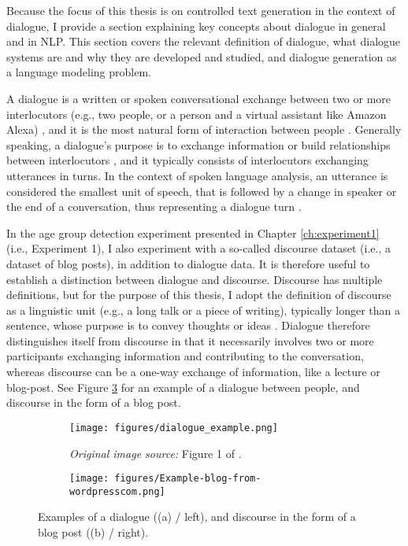Because the focus of this thesis is on controlled text generation in the context of dialogue, I provide a section explaining key concepts about dialogue in general and in NLP. This section covers the relevant definition of dialogue, what dialogue systems are and why they are developed and studied, and dialogue generation as a language modeling problem.

A dialogue is a written or spoken conversational exchange between two or more interlocutors (e.g., two people, or a person and a virtual assistant like Amazon Alexa) \citep{MerriamWebster2021Dialogue_Entry}, and it is the most natural form of interaction between people \citep{burtsev-etal-2018-deeppavlov}.
Generally speaking, a dialogue's purpose is to exchange information or build relationships between interlocutors \citep{bohm2013dialogue}, and it typically consists of interlocutors exchanging utterances in turns. In the context of spoken language analysis, an utterance is considered the smallest unit of speech, that is followed by a change in speaker or the end of a conversation, thus representing a dialogue turn \citep{traum1996utterance}.

In the age group detection experiment presented in Chapter \ref{ch:experiment1} (i.e., Experiment 1), I also experiment with a so-called discourse dataset (i.e., a dataset of blog posts), in addition to dialogue data. It is therefore useful to establish a distinction between dialogue and discourse. Discourse has multiple definitions, but for the purpose of this thesis, I adopt the definition of discourse as a linguistic unit (e.g., a long talk or a piece of writing), typically longer than a sentence, whose purpose is to convey thoughts or ideas \citep{MerriamWebster2021Dialogue_Entry}. Dialogue therefore distinguishes itself from discourse in that it necessarily involves two or more participants exchanging information and contributing to the conversation, whereas discourse can be a one-way exchange of information, like a lecture or blog-post. See Figure \ref{fig:examples_dialogue_blog_post} for an example of a dialogue between people, and discourse in the form of a blog post.


\begin{figure}[H]
     \centering
     \begin{subfigure}[b]{0.45\textwidth}
        \centering
        \texttt{[image: figures/dialogue\_example.png]}
        \caption{\textit{Original image source:} Figure 1 of \cite{liu-etal-2020-impress}.}
        \label{}
     \end{subfigure}
     \hfill
     \begin{subfigure}[b]{0.45\textwidth}
        \centering
        \texttt{[image: figures/Example-blog-from-wordpresscom.png]}
        \caption{}
        \label{}
     \end{subfigure}
        \caption{Examples of a dialogue ((a) / left), and discourse in the form of a blog post ((b) / right).}
        \label{fig:examples_dialogue_blog_post}
\end{figure}

